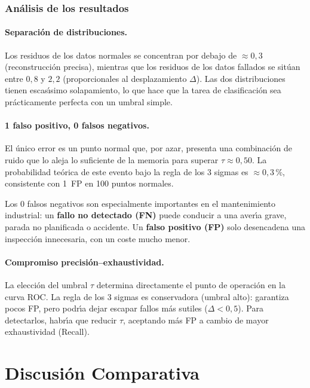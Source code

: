 \documentclass[12pt,a4paper]{article}
\begin{document}
\subsubsection{An\'alisis de los resultados}

\paragraph{Separaci\'on de distribuciones.}
Los residuos de los datos normales se concentran por debajo de $\approx 0{,}3$
(reconstrucci\'on precisa), mientras que los residuos de los datos fallados se
sit\'uan entre $0{,}8$ y $2{,}2$ (proporcionales al desplazamiento $\Delta$). Las
dos distribuciones tienen escas\'{\i}simo solapamiento, lo que hace que la tarea de
clasificaci\'on sea pr\'acticamente perfecta con un umbral simple.

\paragraph{1 falso positivo, 0 falsos negativos.}
El \'unico error es un punto normal que, por azar, presenta una combinaci\'on de
ruido que lo aleja lo suficiente de la memoria para superar $\tau \approx 0{,}50$.
La probabilidad te\'orica de este evento bajo la regla de los 3 sigmas es
$\approx 0{,}3\,\%$, consistente con 1~FP en 100 puntos normales.

Los 0 falsos negativos son especialmente importantes en el mantenimiento
industrial: un \textbf{fallo no detectado (FN)} puede conducir a una aver\'{\i}a
grave, parada no planificada o accidente. Un \textbf{falso positivo (FP)} solo
desencadena una inspecci\'on innecesaria, con un coste mucho menor.

\paragraph{Compromiso precisi\'on--exhaustividad.}
La elecci\'on del umbral $\tau$ determina directamente el punto de operaci\'on
en la curva ROC. La regla de los 3 sigmas es conservadora (umbral alto): garantiza
pocos FP, pero podr\'{\i}a dejar escapar fallos m\'as sutiles ($\Delta < 0{,}5$).
Para detectarlos, habr\'{\i}a que reducir $\tau$, aceptando m\'as FP a cambio de
mayor exhaustividad (Recall).

\section{Discusi\'on Comparativa}
\end{document}
